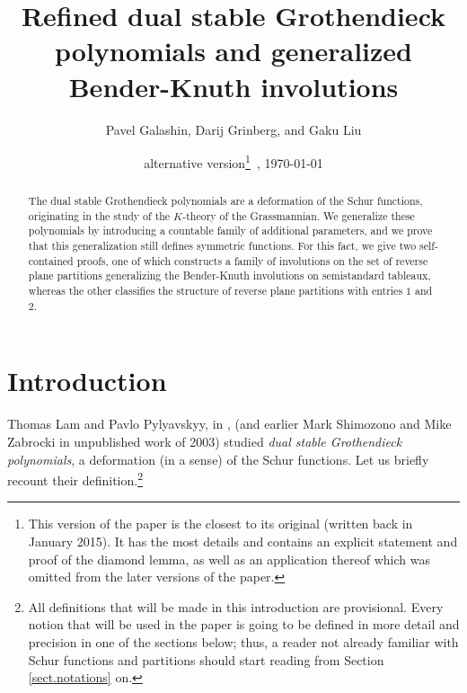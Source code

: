 \documentclass[numbers=enddot,12pt,final,onecolumn,notitlepage]{scrartcl}%
\theoremstyle{definition}
\begin{document}
\title{Refined dual stable Grothendieck polynomials and generalized Bender-Knuth involutions}
\author{Pavel Galashin, Darij Grinberg, and Gaku Liu}
\date{alternative version\footnote{This version of the paper is the closest
to its original (written back in January 2015). It has the most details and
contains an explicit statement and proof of the diamond lemma, as well as
an application thereof which was omitted from the later versions of the
paper.}\ , \today}
\maketitle

\begin{abstract}
The dual stable Grothendieck polynomials are a deformation of
the Schur functions, originating in the study of the $K$-theory of the
Grassmannian. We generalize these polynomials by introducing a
countable family of additional parameters, and we prove that this
generalization still defines symmetric functions. For this fact, we
give two self-contained proofs, one of which constructs a family of
involutions on the set of reverse plane partitions generalizing the
Bender-Knuth involutions on semistandard tableaux, whereas the other
classifies the structure of reverse plane partitions with entries $1$
and $2$.
\end{abstract}

\section{Introduction}

Thomas Lam and Pavlo Pylyavskyy, in \cite[\S 9.1]{LamPyl}, (and earlier Mark
Shimozono and Mike Zabrocki in unpublished work of 2003) studied \textit{dual
stable Grothendieck polynomials}, a deformation (in a sense) of the Schur
functions. Let us briefly recount their definition.\footnote{All definitions
that will be made in this introduction are provisional. Every notion that will
be used in the paper is going to be defined in more detail and precision in
one of the sections below; thus, a reader not already familiar with Schur
functions and partitions should start reading from Section
\ref{sect.notations} on.}
\end{document}
